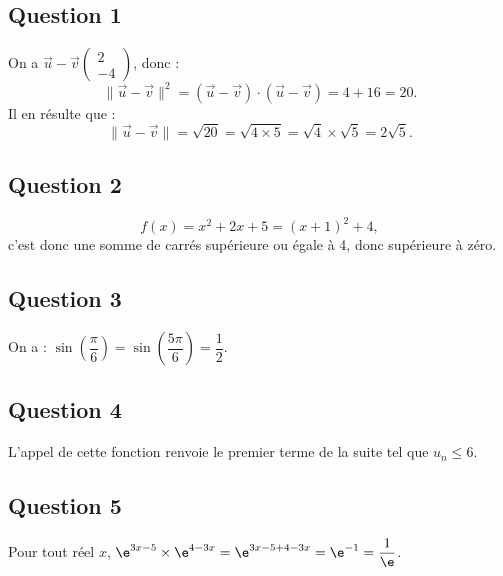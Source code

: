 \subsection*{Question 1}

On a \(\vec{u} - \vec{v}\begin{pmatrix} 2 \\ -4 \end{pmatrix}\), donc :
\[
\|\vec{u} - \vec{v}\|^2 = (\vec{u} - \vec{v}) \cdot (\vec{u} - \vec{v}) = 4 + 16 = 20.
\]
Il en résulte que :
\[
\|\vec{u} - \vec{v}\| = \sqrt{20} = \sqrt{4 \times 5} = \sqrt{4} \times \sqrt{5} = 2\sqrt{5}.
\]

\subsection*{Question 2}

\[
f(x) = x^2 + 2x + 5 = (x + 1)^2 + 4,
\]
c'est donc une somme de carrés supérieure ou égale à 4, donc supérieure à zéro.

\subsection*{Question 3}

On a : \(\sin\left(\dfrac{\pi}{6}\right) = \sin\left(\dfrac{5\pi}{6}\right) = \dfrac{1}{2}\).

\subsection*{Question 4}

L'appel de cette fonction renvoie le premier terme de la suite tel que \(u_n \leqslant 6\).

\subsection*{Question 5}

Pour tout réel \(x\), \(\e^{3x-5} \times \e^{4-3x} = \e^{3x-5+4-3x} = \e^{-1} = \dfrac{1}{\e}\).
